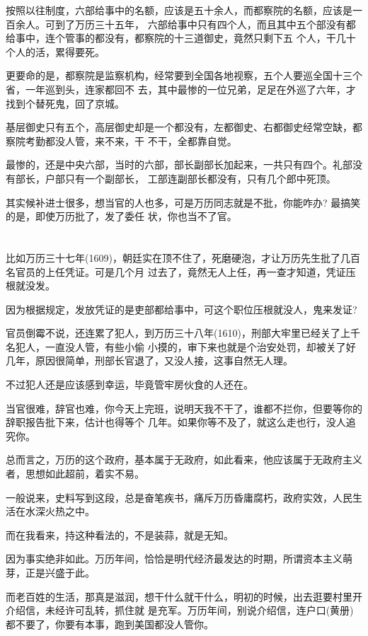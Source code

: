\documentclass[11pt,a4paper,onecolumn]{article}
\begin{document}
按照以往制度，六部给事中的名额，应该是五十余人，而都察院的名额，应该是一百余人。可到了万历三十五年，
六部给事中只有四个人，而且其中五个部没有都给事中，连个管事的都没有，都察院的十三道御史，竟然只剩下五
个人，干几十个人的活，累得要死。

更要命的是，都察院是监察机构，经常要到全国各地视察，五个人要巡全国十三个省，一年巡到头，连家都回不
去，其中最惨的一位兄弟，足足在外巡了六年，才找到个替死鬼，回了京城。

基层御史只有五个，高层御史却是一个都没有，左都御史、右都御史经常空缺，都察院考勤都没人管，来不来，干
不干，全都靠自觉。

最惨的，还是中央六部，当时的六部，部长副部长加起来，一共只有四个。礼部没有部长，户部只有一个副部长，
工部连副部长都没有，只有几个郎中死顶。

其实候补进士很多，想当官的人也多，可是万历同志就是不批，你能咋办? 最搞笑的是，即使万历批了，发了委任
状，你也当不了官。

\section[\thesection]{}

比如万历三十七年(1609)，朝廷实在顶不住了，死磨硬泡，才让万历先生批了几百名官员的上任凭证。可是几个月
过去了，竟然无人上任，再一查才知道，凭证压根就没发。

因为根据规定，发放凭证的是吏部都给事中，可这个职位压根就没人，鬼来发证?

官员倒霉不说，还连累了犯人，到万历三十八年(1610)，刑部大牢里已经关了上千名犯人，一直没人管，有些小偷
小摸的，审下来也就是个治安处罚，却被关了好几年，原因很简单，刑部长官退了，又没人接，这事自然无人理。

不过犯人还是应该感到幸运，毕竟管牢房伙食的人还在。

当官很难，辞官也难，你今天上完班，说明天我不干了，谁都不拦你，但要等你的辞职报告批下来，估计也得等个
几年。如果你等不及了，就这么走也行，没人追究你。

总而言之，万历的这个政府，基本属于无政府，如此看来，他应该属于无政府主义者，思想如此超前，着实不易。

一般说来，史料写到这段，总是奋笔疾书，痛斥万历昏庸腐朽，政府实效，人民生活在水深火热之中。

而在我看来，持这种看法的，不是装蒜，就是无知。

因为事实绝非如此。万历年间，恰恰是明代经济最发达的时期，所谓资本主义萌芽，正是兴盛于此。

而老百姓的生活，那真是滋润，想干什么就干什么，明初的时候，出去逛要村里开介绍信，未经许可乱转，抓住就
是充军。万历年间，别说介绍信，连户口(黄册)都不要了，你要有本事，跑到美国都没人管你。
\end{document}
